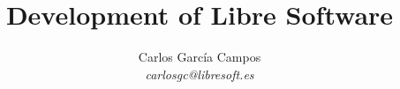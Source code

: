 \documentclass{beamer}
\title{Development of Libre Software}
\subtitle{}
\author{Carlos García Campos \\{\it carlosgc@libresoft.es}}
\institute{}
\date{}
\begin{document}
\begin{frame}
\titlepage
\end{frame}




\end{document}
